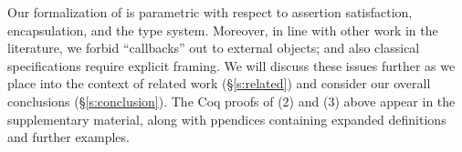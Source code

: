 Our formalization of \Nec %
{  is 
parametric} with respect to assertion
satisfaction, encapsulation, and the type system.
{{Moreover, in line} with other work in the literature,} we forbid 
``callbacks'' out to external objects; and also
classical specifications require explicit framing.
We will discuss these  issues %
further as we place \Nec into the context of 
related work (\S\ref{s:related}) and consider our overall conclusions
(\S\ref{s:conclusion}). 
%
The Coq proofs of 
(2) and (3) above appear in the
supplementary material, along with ppendices containing expanded 
definitions and further examples.
